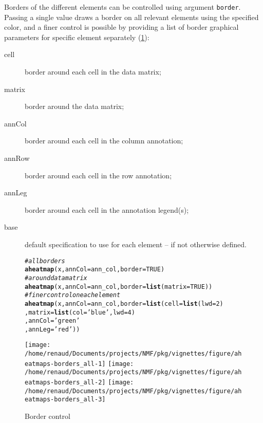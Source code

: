 \documentclass[a4paper]{article}\usepackage[]{graphicx}\usepackage[]{color}
\makeatletter
\newcommand{\hlnum}[1]{\textcolor[rgb]{0.686,0.059,0.569}{#1}}%
\newcommand{\hlstr}[1]{\textcolor[rgb]{0.192,0.494,0.8}{#1}}%
\newcommand{\hlcom}[1]{\textcolor[rgb]{0.678,0.584,0.686}{\textit{#1}}}%
\newcommand{\hlstd}[1]{\textcolor[rgb]{0.345,0.345,0.345}{#1}}%
\newcommand{\hlkwc}[1]{\textcolor[rgb]{0.333,0.667,0.333}{#1}}%
\newcommand{\hlkwd}[1]{\textcolor[rgb]{0.737,0.353,0.396}{\textbf{#1}}}%
\newenvironment{kframe}{%
 \def\at@end@of@kframe{}%
 \ifinner\ifhmode%
  \def\at@end@of@kframe{\end{minipage}}%
  \begin{minipage}{\columnwidth}%
 \fi\fi%
 \def\FrameCommand##1{\hskip\@totalleftmargin \hskip-\fboxsep
 \colorbox{shadecolor}{##1}\hskip-\fboxsep
     \hskip-\linewidth \hskip-\@totalleftmargin \hskip\columnwidth}%
 \MakeFramed {\advance\hsize-\width
   \@totalleftmargin\z@ \linewidth\hsize
   \@setminipage}}%
 {\par\unskip\endMakeFramed%
 \at@end@of@kframe}
\newenvironment{knitrout}{}{} %
\let\code=\texttt
\makeatother
\begin{document}
Borders of the different elements can be controlled using argument
\code{border}. Passing a single value draws a border on all relevant elements
using the specified color, and a finer control is possible
by providing a list of border graphical parameters for specific element
separately (\cref{fig:borders}):

\begin{description}
  \item[cell] border around each cell in the data matrix;
  \item[matrix] border around the data matrix;
  \item[annCol] border around each cell in the column annotation;
  \item[annRow] border around each cell in the row annotation;
  \item[annLeg] border around each cell in the annotation legend(s);
  \item[base] default specification to use for each element -- if not otherwise
  defined.
\end{description}

\begin{figure}[!h]
\begin{knitrout}\small
{}\color{fgcolor}\begin{kframe}
\begin{alltt}
\hlcom{# all borders}
\hlkwd{aheatmap}\hlstd{(x,} \hlkwc{annCol} \hlstd{= ann_col,} \hlkwc{border} \hlstd{=} \hlnum{TRUE}\hlstd{)}
\hlcom{# around data matrix}
\hlkwd{aheatmap}\hlstd{(x,} \hlkwc{annCol} \hlstd{= ann_col,} \hlkwc{border} \hlstd{=} \hlkwd{list}\hlstd{(}\hlkwc{matrix} \hlstd{=} \hlnum{TRUE}\hlstd{))}
\hlcom{# finer control on each element}
\hlkwd{aheatmap}\hlstd{(x,} \hlkwc{annCol} \hlstd{= ann_col,} \hlkwc{border} \hlstd{=} \hlkwd{list}\hlstd{(}\hlkwc{cell} \hlstd{=} \hlkwd{list}\hlstd{(}\hlkwc{lwd}\hlstd{=}\hlnum{2}\hlstd{)}
                                            \hlstd{,} \hlkwc{matrix} \hlstd{=} \hlkwd{list}\hlstd{(}\hlkwc{col}\hlstd{=}\hlstr{'blue'}\hlstd{,} \hlkwc{lwd}\hlstd{=}\hlnum{4}\hlstd{)}
                                            \hlstd{,} \hlkwc{annCol}\hlstd{=}\hlstr{'green'}
                                            \hlstd{,} \hlkwc{annLeg} \hlstd{=} \hlstr{'red'}\hlstd{))}
\end{alltt}
\end{kframe}
\texttt{[image: /home/renaud/Documents/projects/NMF/pkg/vignettes/figure/aheatmaps-borders\_all-1]} 
\texttt{[image: /home/renaud/Documents/projects/NMF/pkg/vignettes/figure/aheatmaps-borders\_all-2]} 
\texttt{[image: /home/renaud/Documents/projects/NMF/pkg/vignettes/figure/aheatmaps-borders\_all-3]} 

\end{knitrout}
\caption{Border control}\label{fig:borders}
\end{figure}
\end{document}
